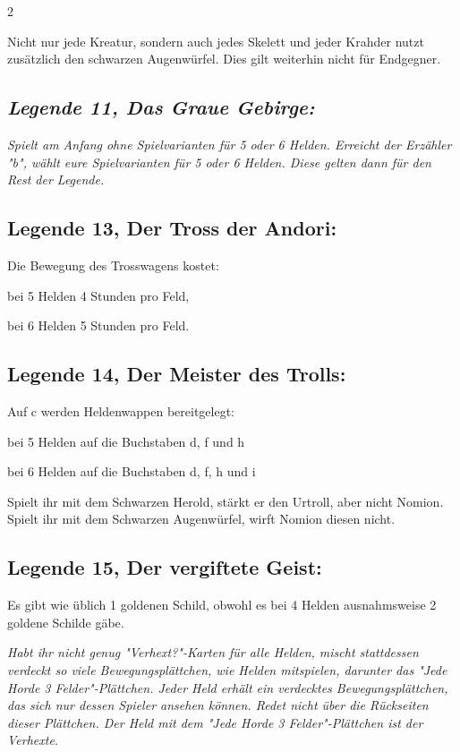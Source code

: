 \documentclass[10pt, a4paper, oneside]{book}
\newcommand{\fan}[1]{\textit{#1}}
\begin{document}
\begin{multicols*}{2}
\begin{bgcolor}
Nicht nur jede Kreatur, sondern auch jedes Skelett und jeder Krahder nutzt zusätzlich den schwarzen Augenwürfel.
\supercite{dh17-a0-5-6}
Dies gilt weiterhin nicht für Endgegner.






\subsection{\fan{Legende 11, Das Graue Gebirge:}}

\fan{Spielt am Anfang ohne Spielvarianten für 5 oder 6 Helden. Erreicht der Erzähler "b", wählt eure Spielvarianten für 5 oder 6 Helden. Diese gelten dann für den Rest der Legende.}


\subsection{Legende 13, Der Tross der Andori:}

Die Bewegung des Trosswagens kostet:
\supercite{dh13-e-5-6,mh-dlh-5-6}

\bullet{} bei 5 Helden 4 Stunden pro Feld,

\bullet{} bei 6 Helden 5 Stunden pro Feld.



\subsection{Legende 14, Der Meister des Trolls:}

Auf c werden Heldenwappen bereitgelegt:
\supercite{dh14-c-5-6,mh-dlh-5-6}

\bullet{} bei 5 Helden auf die Buchstaben d, f und h

\bullet{} bei 6 Helden auf die Buchstaben d, f, h und i


Spielt ihr mit dem Schwarzen Herold, stärkt er den Urtroll, aber nicht Nomion.
\supercite{dh-begleitheft}
Spielt ihr mit dem Schwarzen Augenwürfel, wirft Nomion diesen nicht.
\supercite{dh14-der-einsame-turm-2}


\subsection{Legende 15, Der vergiftete Geist:}

Es gibt wie üblich 1 goldenen Schild, obwohl es bei 4 Helden ausnahmsweise 2 goldene Schilde gäbe.
\supercite{dlh15-a4-5-6,mh-dlh-5-6}

\fan{Habt ihr nicht genug "Verhext?"-Karten für alle Helden, mischt stattdessen verdeckt so viele Bewegungsplättchen, wie Helden mitspielen, darunter das "Jede Horde 3 Felder"-Plättchen. Jeder Held erhält ein verdecktes Bewegungsplättchen, das sich nur dessen Spieler ansehen können. Redet nicht über die Rückseiten dieser Plättchen. Der Held mit dem "Jede Horde 3 Felder"-Plättchen ist der Verhexte.}


\end{bgcolor}
\end{multicols*}
\end{document}
